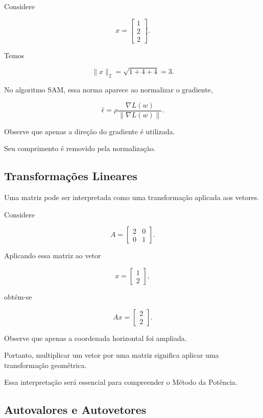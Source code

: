\documentclass[12pt, a4paper]{article}
\begin{document}
Considere

\[
x=
\begin{bmatrix}
1\\
2\\
2
\end{bmatrix}.
\]

Temos

\[
\|x\|_2
=
\sqrt{1+4+4}
=
3.
\]

No algoritmo SAM, essa norma aparece ao normalizar o gradiente,

\[
\hat{\epsilon}
=
\rho
\frac{\nabla L(w)}
{\|\nabla L(w)\|}.
\]

Observe que apenas a direção do gradiente é utilizada.

Seu comprimento é removido pela normalização.

\subsection{Transformações Lineares}

Uma matriz pode ser interpretada como uma transformação aplicada aos vetores.

Considere

\[
A=
\begin{bmatrix}
2&0\\
0&1
\end{bmatrix}.
\]

Aplicando essa matriz ao vetor

\[
x=
\begin{bmatrix}
1\\
2
\end{bmatrix},
\]

obtém-se

\[
Ax=
\begin{bmatrix}
2\\
2
\end{bmatrix}.
\]

Observe que apenas a coordenada horizontal foi ampliada.

Portanto, multiplicar um vetor por uma matriz significa aplicar uma
transformação geométrica.

Essa interpretação será essencial para compreender o Método da Potência.

\subsection{Autovalores e Autovetores}
\end{document}
